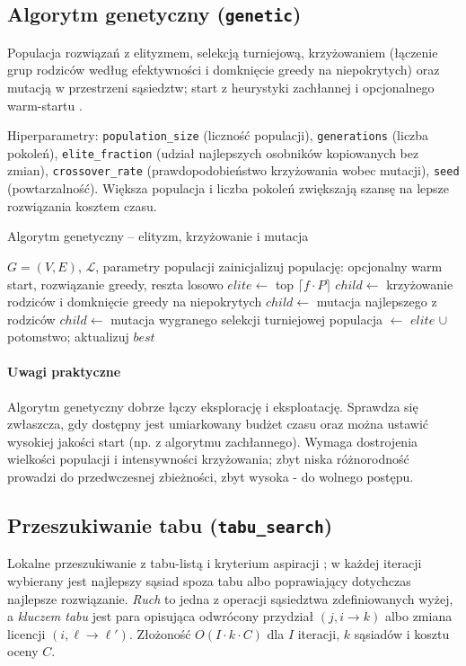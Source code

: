 \subsection{Algorytm genetyczny (\texttt{genetic})}\label{subsec:ga}
Populacja rozwiązań z elityzmem, selekcją turniejową, krzyżowaniem (łączenie grup rodziców według efektywności i domknięcie greedy na niepokrytych) oraz mutacją w przestrzeni sąsiedztw; start z heurystyki zachłannej i opcjonalnego warm-startu \cite{holland1975,goldberg1989}.

Hiperparametry: \texttt{population\_size} (liczność populacji), \texttt{generations} (liczba pokoleń), \texttt{elite\_fraction} (udział najlepszych osobników kopiowanych bez zmian), \texttt{crossover\_rate} (prawdopodobieństwo krzyżowania wobec mutacji), \texttt{seed} (powtarzalność). Większa populacja i liczba pokoleń zwiększają szansę na lepsze rozwiązania kosztem czasu.

\begin{algorithm}[H]
\caption{Algorytm genetyczny -- elityzm, krzyżowanie i mutacja}
\label{alg:ga}
\begin{algorithmic}[1]
\Require $G=(V,E)$, $\mathcal{L}$, parametry populacji
\State zainicjalizuj populację: opcjonalny warm start, rozwiązanie greedy, reszta losowo
  \State $elite \gets$ top $\lceil f\cdot P\rceil$
      \State $child\gets$ krzyżowanie rodziców i domknięcie greedy na niepokrytych
        \State $child\gets$ mutacja najlepszego z rodziców
      \EndIf
    \Else
      \State $child\gets$ mutacja wygranego selekcji turniejowej
    \EndIf
  \EndWhile
  \State populacja $\gets$ $elite$ $\cup$ potomstwo; aktualizuj $best$
\EndFor
\end{algorithmic}
\end{algorithm}

\paragraph{Uwagi praktyczne}
Algorytm genetyczny dobrze łączy eksplorację i eksploatację. Sprawdza się zwłaszcza, gdy dostępny jest umiarkowany budżet czasu oraz można ustawić wysokiej jakości start (np. z algorytmu zachłannego). Wymaga dostrojenia wielkości populacji i intensywności krzyżowania; zbyt niska różnorodność prowadzi do przedwczesnej zbieżności, zbyt wysoka - do wolnego postępu.

\subsection{Przeszukiwanie tabu (\texttt{tabu\_search})}\label{subsec:tabu}
Lokalne przeszukiwanie z tabu-listą i kryterium aspiracji \cite{glover1989}; w każdej iteracji wybierany jest najlepszy sąsiad spoza tabu albo poprawiający dotychczas najlepsze rozwiązanie. \emph{Ruch} to jedna z operacji sąsiedztwa zdefiniowanych wyżej, a \emph{kluczem tabu} jest para opisująca odwrócony przydział $(j, i\to k)$ albo zmiana licencji $(i,\ell\to\ell')$. Złożoność $O(I\cdot k\cdot C)$ dla \(I\) iteracji, \(k\) sąsiadów i kosztu oceny \(C\).


